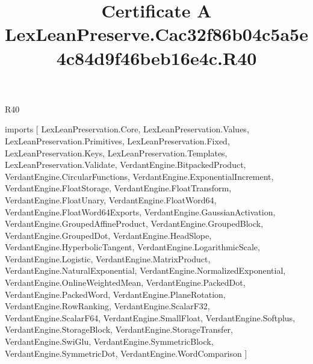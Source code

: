 \begin{lexlean}{R40}
\title{Certificate A LexLeanPreserve.Cac32f86b04c5a5e4c84d9f46beb16e4c.R40}
\begin{coremodule}
imports [
  LexLeanPreservation.Core,
  LexLeanPreservation.Values,
  LexLeanPreservation.Primitives,
  LexLeanPreservation.Fixed,
  LexLeanPreservation.Keys,
  LexLeanPreservation.Templates,
  LexLeanPreservation.Validate,
  VerdantEngine.BitpackedProduct,
  VerdantEngine.CircularFunctions,
  VerdantEngine.ExponentialIncrement,
  VerdantEngine.FloatStorage,
  VerdantEngine.FloatTransform,
  VerdantEngine.FloatUnary,
  VerdantEngine.FloatWord64,
  VerdantEngine.FloatWord64Exports,
  VerdantEngine.GaussianActivation,
  VerdantEngine.GroupedAffineProduct,
  VerdantEngine.GroupedBlock,
  VerdantEngine.GroupedDot,
  VerdantEngine.HeadSlope,
  VerdantEngine.HyperbolicTangent,
  VerdantEngine.LogarithmicScale,
  VerdantEngine.Logistic,
  VerdantEngine.MatrixProduct,
  VerdantEngine.NaturalExponential,
  VerdantEngine.NormalizedExponential,
  VerdantEngine.OnlineWeightedMean,
  VerdantEngine.PackedDot,
  VerdantEngine.PackedWord,
  VerdantEngine.PlaneRotation,
  VerdantEngine.RowRanking,
  VerdantEngine.ScalarF32,
  VerdantEngine.ScalarF64,
  VerdantEngine.SmallFloat,
  VerdantEngine.Softplus,
  VerdantEngine.StorageBlock,
  VerdantEngine.StorageTransfer,
  VerdantEngine.SwiGlu,
  VerdantEngine.SymmetricBlock,
  VerdantEngine.SymmetricDot,
  VerdantEngine.WordComparison
]


\end{coremodule}
\end{lexlean}
